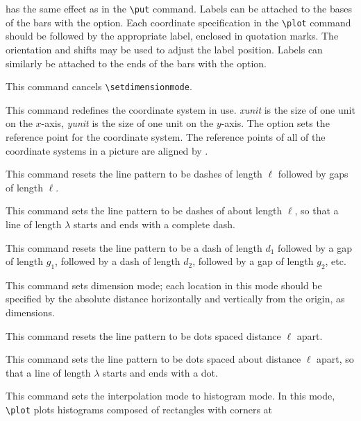 \begin{syntax}
 has the same effect as in the \verb+\put+ command.
Labels can be attached to the bases of the bars with the 
option. Each coordinate specification in the \verb+\plot+ command should be
followed by the appropriate label, enclosed in quotation marks. The
orientation and shifts may be used to adjust the label position.
Labels can similarly be attached to the ends of the bars with the
option.
\item[\tt\bsl setcoordinatemode]
This command cancels \verb+\setdimensionmode+.
\item[{\tt\bsl setcoordinatesystem {\rm[}units <\emph{xunit},\emph{yunit}>{\rm]} {\rm[}
point at \emph{xcoord} \emph{ycoord}{\rm]}}]
This command redefines the coordinate system in use. \emph{xunit} is the size of
one unit on the $x$-axis, \emph{yunit} is the size of one unit on the $y$-axis. The
 option sets the reference point for the coordinate system. The
reference points of all of the coordinate systems in a picture are aligned by
\PiCTeX.
\item[{\tt\bsl setdashes {\rm[}<$\ell$>{\rm]}}]
This command resets the line pattern to be dashes of length $\ell$ followed by
gaps of length $\ell$.
\item[\tt\bsl setdashesnear <$\ell$> for <$\lambda$>]
This command sets the line pattern to be dashes of about length $\ell$, so
that a line of length $\lambda$ starts and ends with a complete dash.
\item[\tt\bsl setdashpattern <$d_1$,$g_1$,$d_2$,$g_2$,\ldots>]
This command resets the line pattern to be a dash of length $d_1$ followed by
a gap of length $g_1$, followed by a dash of length $d_2$, followed by a gap
of length $g_2$, etc.
\item[\tt\bsl setdimensionmode]
This command sets dimension mode; each location in this mode should be
specified by the absolute distance horizontally and vertically from the
origin, as dimensions.
\item[{\tt\bsl setdots {\rm[}<$\ell$>{\rm]}}]
This command resets the line pattern to be dots spaced distance $\ell$ apart.
\item[\tt\bsl setdotsnear <$\ell$> for <$\lambda$>]
This command sets the line pattern to be dots spaced about distance $\ell$
apart, so
that a line of length $\lambda$ starts and ends with a dot.
\item[\tt\bsl sethistograms]
This command sets the interpolation mode to histogram mode. In this mode,
\verb+\plot+ plots histograms composed of rectangles with corners at

\end{syntax}
